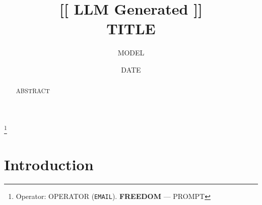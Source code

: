 \documentclass[10pt,a4paper]{amsart}
\begin{document}

%
%
\title[{{TITLE}}]{%
  {\normalfont\normalsize [[ LLM Generated ]]}\\[0.8ex]
  {{TITLE}}}
\author{{{MODEL}}}
\thanks{Operator: {{OPERATOR}} (\texttt{{{EMAIL}}}). \textbf{{{FREEDOM}}} --- {{PROMPT}}}
\date{{{DATE}}}

\begin{abstract}
{{ABSTRACT}}
\end{abstract}

\maketitle


\section{Introduction}\label{sec:intro}



\end{document}
